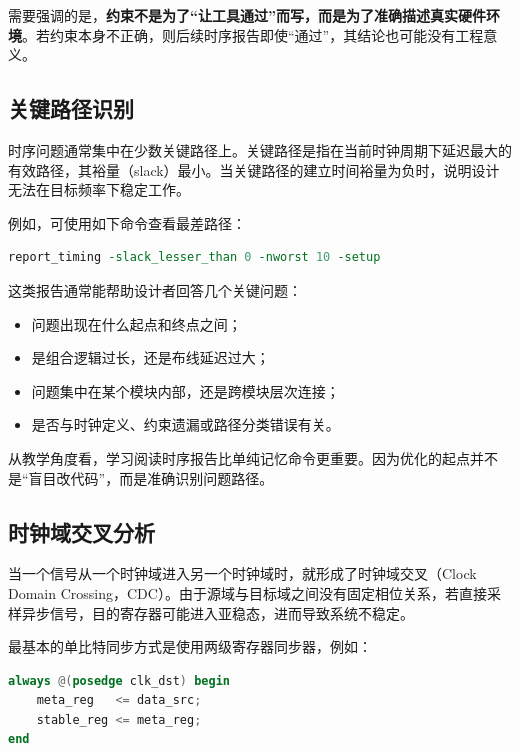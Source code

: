 需要强调的是，\textbf{约束不是为了``让工具通过''而写，而是为了准确描述真实硬件环境}。若约束本身不正确，则后续时序报告即使``通过''，其结论也可能没有工程意义。

\subsection{关键路径识别}\label{ux5173ux952eux8defux5f84ux8bc6ux522b}

时序问题通常集中在少数关键路径上。关键路径是指在当前时钟周期下延迟最大的有效路径，其裕量（slack）最小。当关键路径的建立时间裕量为负时，说明设计无法在目标频率下稳定工作。

例如，可使用如下命令查看最差路径：

\begin{lstlisting}[language=tcl]
report_timing -slack_lesser_than 0 -nworst 10 -setup
\end{lstlisting}

这类报告通常能帮助设计者回答几个关键问题：

\begin{itemize}
\tightlist
\item
  问题出现在什么起点和终点之间；
\item
  是组合逻辑过长，还是布线延迟过大；
\item
  问题集中在某个模块内部，还是跨模块层次连接；
\item
  是否与时钟定义、约束遗漏或路径分类错误有关。
\end{itemize}

从教学角度看，学习阅读时序报告比单纯记忆命令更重要。因为优化的起点并不是``盲目改代码''，而是准确识别问题路径。

\subsection{时钟域交叉分析}\label{ux65f6ux949fux57dfux4ea4ux53c9ux5206ux6790}

当一个信号从一个时钟域进入另一个时钟域时，就形成了时钟域交叉（Clock
Domain
Crossing，CDC）。由于源域与目标域之间没有固定相位关系，若直接采样异步信号，目的寄存器可能进入亚稳态，进而导致系统不稳定。

最基本的单比特同步方式是使用两级寄存器同步器，例如：

\begin{lstlisting}[language=Verilog]
always @(posedge clk_dst) begin
    meta_reg   <= data_src;
    stable_reg <= meta_reg;
end
\end{lstlisting}

